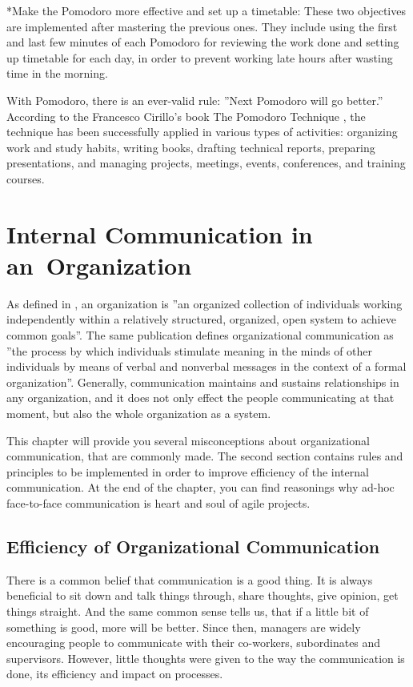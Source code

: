 \documentclass[11pt,singleside]{myfithesis2}
\makeatletter
\renewcommand\paragraph{
   \vspace{-10pt}
   \@startsection{paragraph}{4}{0mm}
      {\baselineskip}
      {- 5pt}
      {\normalfont\normalsize\bfseries}
}
\makeatother
\begin{document}
\paragraph*{Make the Pomodoro more effective and set up a timetable: } These two objectives are implemented after mastering the previous ones. They include using the first and last few minutes of each Pomodoro for reviewing the work done and setting up timetable for each day, in order to prevent working late hours after wasting time in the morning.

\vspace{\baselineskip}
With Pomodoro, there is an ever-valid rule: ''Next Pomodoro will go better.'' According to the Francesco Cirillo's book The Pomodoro Technique \cite{pomodoro}, the technique has been successfully applied in various types of activities: organizing work and study habits, writing books, drafting technical reports, preparing presentations, and managing projects, meetings, events, conferences, and training courses.


\chapter{Internal Communication in an~Organization}\label{internalCommunication}

As defined in \cite{orgCommForSurvival}, an organization is ''an organized collection of individuals working independently within a relatively structured, organized, open system to achieve common goals''. The same publication defines organizational communication as ''the process by which individuals stimulate meaning in the minds of other individuals by means of verbal and nonverbal messages in the context of a formal organization''. Generally, communication maintains and sustains relationships in any organization, and it does not only effect the people communicating at that moment, but also the whole organization as a system.

This chapter will provide you several misconceptions about organizational communication, that are commonly made. The second section contains rules and principles to be implemented in order to improve efficiency of the internal communication. At the end of the chapter, you can find reasonings why ad-hoc face-to-face communication is heart and soul of agile projects.


	\section{Efficiency of Organizational Communication}\label{effOfOrgComm}
There is a common belief that communication is a good thing. It is always beneficial to sit down and talk things through, share thoughts, give opinion, get things straight. And the same common sense tells us, that if a little bit of something is good, more will be better. Since then, managers are widely encouraging people to communicate with their co-workers, subordinates and supervisors. However, little thoughts were given to the way the communication is done, its efficiency and impact on processes. 
\end{document}
